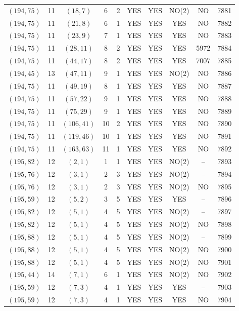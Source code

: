 \begin{longtable}{|c|c|c|c|c|c|c|c|c|c|}
$(194, 75)$ & 11 & $(18, 7)$ & 6 & 2 & YES & YES & NO(2) & NO & 7881\\
$(194, 75)$ & 11 & $(21, 8)$ & 6 & 1 & YES & YES & YES & NO & 7882\\
$(194, 75)$ & 11 & $(23, 9)$ & 7 & 1 & YES & YES & YES & NO & 7883\\
$(194, 75)$ & 11 & $(28, 11)$ & 8 & 2 & YES & YES & YES & 5972 & 7884\\
$(194, 75)$ & 11 & $(44, 17)$ & 8 & 2 & YES & YES & YES & 7007 & 7885\\
$(194, 45)$ & 13 & $(47, 11)$ & 9 & 1 & YES & YES & NO(2) & NO & 7886\\
$(194, 75)$ & 11 & $(49, 19)$ & 8 & 1 & YES & YES & YES & NO & 7887\\
$(194, 75)$ & 11 & $(57, 22)$ & 9 & 1 & YES & YES & YES & NO & 7888\\
$(194, 75)$ & 11 & $(75, 29)$ & 9 & 1 & YES & YES & YES & NO & 7889\\
$(194, 75)$ & 11 & $(106, 41)$ & 10 & 2 & YES & YES & YES & NO & 7890\\
$(194, 75)$ & 11 & $(119, 46)$ & 10 & 1 & YES & YES & YES & NO & 7891\\
$(194, 75)$ & 11 & $(163, 63)$ & 11 & 1 & YES & YES & YES & NO & 7892\\
$(195, 82)$ & 12 & $(2, 1)$ & 1 & 1 & YES & YES & NO(2) & -- & 7893\\
$(195, 76)$ & 12 & $(3, 1)$ & 2 & 3 & YES & YES & NO(2) & -- & 7894\\
$(195, 76)$ & 12 & $(3, 1)$ & 2 & 3 & YES & YES & NO(2) & NO & 7895\\
$(195, 59)$ & 12 & $(5, 2)$ & 3 & 5 & YES & YES & YES & -- & 7896\\
$(195, 82)$ & 12 & $(5, 1)$ & 4 & 5 & YES & YES & NO(2) & -- & 7897\\
$(195, 82)$ & 12 & $(5, 1)$ & 4 & 5 & YES & YES & NO(2) & NO & 7898\\
$(195, 88)$ & 12 & $(5, 1)$ & 4 & 5 & YES & YES & NO(2) & -- & 7899\\
$(195, 88)$ & 12 & $(5, 1)$ & 4 & 5 & YES & YES & NO(2) & NO & 7900\\
$(195, 88)$ & 12 & $(5, 1)$ & 4 & 5 & YES & YES & NO(2) & NO & 7901\\
$(195, 44)$ & 14 & $(7, 1)$ & 6 & 1 & YES & YES & NO(2) & NO & 7902\\
$(195, 59)$ & 12 & $(7, 3)$ & 4 & 1 & YES & YES & YES & -- & 7903\\
$(195, 59)$ & 12 & $(7, 3)$ & 4 & 1 & YES & YES & YES & NO & 7904\\

\end{longtable}

